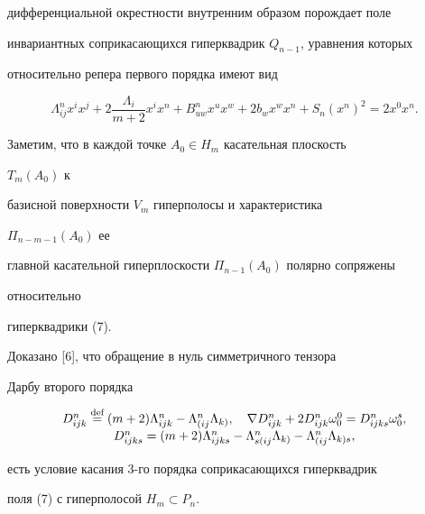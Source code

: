 дифференциальной окрестности внутренним образом порождает поле  


инвариантных соприкасающихся гиперквадрик $Q_{n-1}$, уравнения которых  


относительно репера первого порядка имеют вид 


\begin{equation} 


\Lambda^n_{ij}x^i x^j+2\frac{\Lambda_i}{m+2}x^i x^n+ 


B^n_{u w}x^u x^w+2b_w x^w x^n+S_n(x^n)^2=2x^0 x^n. 


\end{equation} 


Заметим, что в каждой точке $A_0\in H_m$ касательная плоскость 


$T_m(A_0)$ к  


базисной поверхности $V_m$ гиперполосы и характеристика 


$\Pi_{n-m-1}(A_0)$ ее  


главной касательной гиперплоскости $\Pi_{n-1}(A_0)$ полярно сопряжены 


относительно 


гиперквадрики (7). 


 


Доказано [6], что обращение в нуль симметричного тензора  


Дарбу второго порядка 


\begin{equation} 


\begin{array}{c} 


D^n_{ij k}\up{\text{def}}{=}(m+2)\Lambda^n_{ij k}- 


\Lambda^n_{(ij}\Lambda_{k)},\quad 


\nabla D^n_{ij k}+2D^n_{ij k}\omega^0_0=D^n_{ij k s}\omega^s_0,\\ 


D^n_{ij k s}=(m+2)\Lambda^n_{ij k s}- 


\Lambda^n_{s(ij}\Lambda_{k)}- 


\Lambda^n_{(ij}\Lambda_{k)s},


\end{array} 


\end{equation} 


есть условие касания 3-го порядка соприкасающихся гиперквадрик  


поля (7) с гиперполосой $H_m\subset P_n$. 


